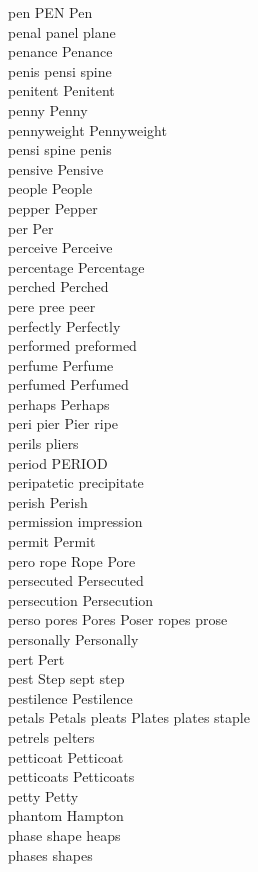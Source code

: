 pen PEN Pen\\
penal panel plane\\
penance Penance\\
penis pensi spine\\
penitent Penitent\\
penny Penny\\
pennyweight Pennyweight\\
pensi spine penis\\
pensive Pensive\\
people People\\
pepper Pepper\\
per Per\\
perceive Perceive\\
percentage Percentage\\
perched Perched\\
pere pree peer\\
perfectly Perfectly\\
performed preformed\\
perfume Perfume\\
perfumed Perfumed\\
perhaps Perhaps\\
peri pier Pier ripe\\
perils pliers\\
period PERIOD\\
peripatetic precipitate\\
perish Perish\\
permission impression\\
permit Permit\\
pero rope Rope Pore\\
persecuted Persecuted\\
persecution Persecution\\
perso pores Pores Poser ropes prose\\
personally Personally\\
pert Pert\\
pest Step sept step\\
pestilence Pestilence\\
petals Petals pleats Plates plates staple\\
petrels pelters\\
petticoat Petticoat\\
petticoats Petticoats\\
petty Petty\\
phantom Hampton\\
phase shape heaps\\
phases shapes\\
